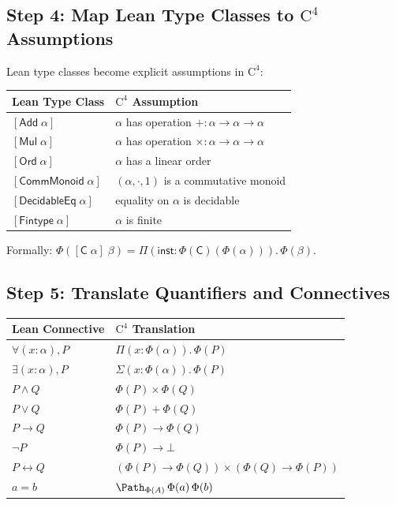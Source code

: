 \subsection{Step 4: Map Lean Type Classes to $\mathrm{C}^4$ Assumptions}

Lean type classes become explicit assumptions in $\mathrm{C}^4$:

\begin{center}
\begin{tabular}{ll}
\toprule
\textbf{Lean Type Class} & \textbf{$\mathrm{C}^4$ Assumption} \\
\midrule
$[\mathsf{Add}\;\alpha]$ & $\alpha$ has operation $+ : \alpha \to \alpha \to \alpha$ \\
$[\mathsf{Mul}\;\alpha]$ & $\alpha$ has operation $\times : \alpha \to \alpha \to \alpha$ \\
$[\mathsf{Ord}\;\alpha]$ & $\alpha$ has a linear order \\
$[\mathsf{CommMonoid}\;\alpha]$ & $(\alpha, \cdot, 1)$ is a commutative monoid \\
$[\mathsf{DecidableEq}\;\alpha]$ & equality on $\alpha$ is decidable \\
$[\mathsf{Fintype}\;\alpha]$ & $\alpha$ is finite \\
\bottomrule
\end{tabular}
\end{center}

\noindent
Formally: $\Phi([\mathsf{C}\;\alpha]\;\beta) =
\Pi(\mathsf{inst} : \Phi(\mathsf{C})(\Phi(\alpha))).\,\Phi(\beta)$.

\subsection{Step 5: Translate Quantifiers and Connectives}

\begin{center}
\begin{tabular}{ll}
\toprule
\textbf{Lean Connective} & \textbf{$\mathrm{C}^4$ Translation} \\
\midrule
$\forall (x : \alpha), P$ & $\Pi(x : \Phi(\alpha)).\,\Phi(P)$ \\
$\exists (x : \alpha), P$ & $\Sigma(x : \Phi(\alpha)).\,\Phi(P)$ \\
$P \wedge Q$ & $\Phi(P) \times \Phi(Q)$ \\
$P \vee Q$ & $\Phi(P) + \Phi(Q)$ \\
$P \to Q$ & $\Phi(P) \to \Phi(Q)$ \\
$\neg P$ & $\Phi(P) \to \bot$ \\
$P \leftrightarrow Q$ & $(\Phi(P) \to \Phi(Q)) \times (\Phi(Q) \to \Phi(P))$ \\
$a = b$ & $\Path_{\Phi(A)}\,\Phi(a)\,\Phi(b)$ \\
\bottomrule
\end{tabular}
\end{center}

